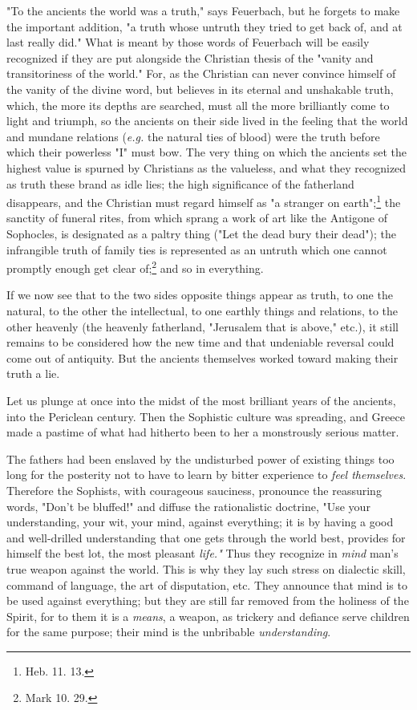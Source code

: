 "{}To the ancients the world was a truth,"{} says Feuerbach, but he forgets to 
make the important addition, "{}a truth whose untruth they tried to get back 
of, and at last really did."{} What is meant by those words of Feuerbach will 
be easily recognized if they are put alongside the Christian thesis of the 
"{}vanity and transitoriness of the world."{} For, as the Christian can never 
convince himself of the vanity of the divine word, but believes in its eternal 
and unshakable truth, which, the more its depths are searched, must all the 
more brilliantly come to light and triumph, so the ancients on their side 
lived in the feeling that the world and mundane relations (\textit{e.g.} the 
natural ties of blood) were the truth before which their powerless "{}I"{} 
must bow. The very thing on which the ancients set the highest value is 
spurned by Christians as the valueless, and what they recognized as truth 
these brand as idle lies; the high significance of the fatherland disappears, 
and the Christian must regard himself as "{}a stranger on 
earth"{};\footnote{Heb. 11. 13.} the sanctity of funeral rites, from which 
sprang a work of art like the Antigone of Sophocles, is designated as a paltry 
thing ("{}Let the dead bury their dead"{}); the infrangible truth of family 
ties is represented as an untruth which one cannot promptly enough get clear 
of;\footnote{Mark 10. 29.} and so in everything.

If we now see that to the two sides opposite things appear as truth, to one 
the natural, to the other the intellectual, to one earthly things and 
relations, to the other heavenly (the heavenly fatherland, "{}Jerusalem that 
is above,"{} etc.), it still remains to be considered how the new time and 
that undeniable reversal could come out of antiquity. But the ancients 
themselves worked toward making their truth a lie.

Let us plunge at once into the midst of the most brilliant years of the 
ancients, into the Periclean century. Then the Sophistic culture was 
spreading, and Greece made a pastime of what had hitherto been to her a 
monstrously serious matter.

The fathers had been enslaved by the undisturbed power of existing things too 
long for the posterity not to have to learn by bitter experience to 
\textit{feel themselves}. Therefore the Sophists, with courageous sauciness, 
pronounce the reassuring words, "{}Don't be bluffed!"{} and diffuse the 
rationalistic doctrine, "{}Use your understanding, your wit, your mind, 
against everything; it is by having a good and well-drilled understanding that 
one gets through the world best, provides for himself the best lot, the most 
pleasant \textit{life."{}} Thus they recognize in \textit{mind} man's true 
weapon against the world. This is why they lay such stress on dialectic skill, 
command of language, the art of disputation, etc. They announce that mind is 
to be used against everything; but they are still far removed from the 
holiness of the Spirit, for to them it is a \textit{means}, a weapon, as 
trickery and defiance serve children for the same purpose; their mind is the 
unbribable \textit{understanding}.

